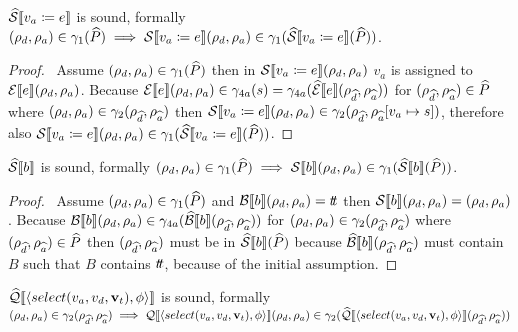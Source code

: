\begin{conjecture}\label{thm:sound-assign}
    $\widehat{\mathcal{S}} \llbracket v_a \coloneqq e \rrbracket$ is sound, formally $(\rho_d, \rho_a) \in \gamma_1(\widehat{P}) \implies \mathcal{S} \llbracket v_a \coloneqq e \rrbracket(\rho_d, \rho_a) \in \gamma_1(\widehat{\mathcal{S}} \llbracket v_a \coloneqq e \rrbracket(\widehat{P}))$.
\end{conjecture}


\begin{proof}
    \pf\
    Assume $(\rho_{d}, \rho_{a}) \in \gamma_1(\widehat{P})$ then in $\mathcal{S} \llbracket v_a \coloneqq e \rrbracket(\rho_{d}, \rho_{a})$ $v_a$ is assigned to $\mathcal{E}\llbracket e \rrbracket(\rho_{d}, \rho_{a})$.
    Because $\mathcal{E}\llbracket e \rrbracket(\rho_{d}, \rho_{a}) \in \gamma_{4a}(s) = \gamma_{4a}(\widehat{\mathcal{E}}\llbracket e \rrbracket(\rho_{\widehat{d}}, \rho_{\widehat{a}}))$ for $(\rho_{\widehat{d}}, \rho_{\widehat{a}}) \in \widehat{P}$ where $(\rho_{d}, \rho_{a}) \in \gamma_2(\rho_{\widehat{d}}, \rho_{\widehat{a}})$ then $\mathcal{S} \llbracket v_a \coloneqq e \rrbracket(\rho_{d}, \rho_{a}) \in \gamma_2(\rho_{\widehat{d}}, \rho_{\widehat{a}}[v_a \mapsto s])$, therefore also $\mathcal{S} \llbracket v_a \coloneqq e \rrbracket(\rho_{d}, \rho_{a})\in \gamma_1(\widehat{\mathcal{S}} \llbracket v_a \coloneqq e \rrbracket(\widehat{P}))$.
\end{proof}


\begin{conjecture}\label{thm:sound-boolsem}
    $\widehat{\mathcal{S}} \llbracket b \rrbracket$ is sound, formally $(\rho_d, \rho_a) \in \gamma_1(\widehat{P}) \implies \mathcal{S} \llbracket b \rrbracket(\rho_d, \rho_a) \in \gamma_1(\widehat{\mathcal{S}} \llbracket b \rrbracket(\widehat{P}))$.
\end{conjecture}


\begin{proof}
    \pf\
    Assume $(\rho_{d}, \rho_{a}) \in \gamma_1(\widehat{P})$ and $\mathcal{B}\llbracket b \rrbracket(\rho_{d}, \rho_{a}) = t\!t$ then $\mathcal{S} \llbracket b \rrbracket(\rho_{d}, \rho_{a}) = (\rho_{d}, \rho_{a})$.
    Because $\mathcal{B}\llbracket b \rrbracket(\rho_{d}, \rho_{a}) \in \gamma_{4a}(\widehat{\mathcal{B}}\llbracket b \rrbracket(\rho_{\widehat{d}}, \rho_{\widehat{a}}))$ for $(\rho_{d}, \rho_{a}) \in \gamma_2(\rho_{\widehat{d}}, \rho_{\widehat{a}})$ where $(\rho_{\widehat{d}}, \rho_{\widehat{a}}) \in \widehat{P}$ then $(\rho_{\widehat{d}}, \rho_{\widehat{a}})$ must be in $\widehat{\mathcal{S}} \llbracket b \rrbracket(\widehat{P})$ because $\widehat{\mathcal{B}}\llbracket b \rrbracket(\rho_{\widehat{d}}, \rho_{\widehat{a}})$ must contain $B$ such that $B$ contains $t\!t$, because of the initial assumption.
\end{proof}


\begin{conjecture}\label{thm:sound-select}
    $\widehat{\mathcal{Q}}\llbracket \langle select(v_a, v_d, \mathbf{v}_t), \phi \rangle \rrbracket$ is sound, formally $(\rho_d, \rho_a) \in \gamma_2(\rho_{\widehat{d}}, \rho_{\widehat{a}}) \implies \mathcal{Q}\llbracket \langle select(v_a, v_d, \mathbf{v}_t), \phi \rangle \rrbracket(\rho_d, \rho_a) \in \gamma_2(\widehat{\mathcal{Q}}\llbracket \langle select(v_a, v_d, \mathbf{v}_t), \phi \rangle \rrbracket(\rho_{\widehat{d}}, \rho_{\widehat{a}}))$
\end{conjecture}



